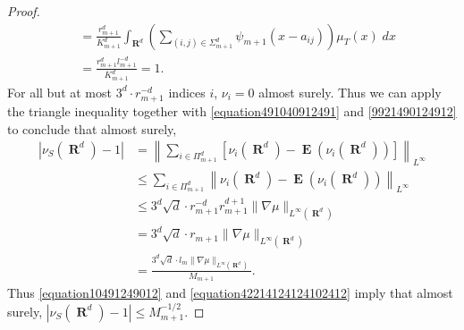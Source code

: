 \documentclass[12pt,reqno]{article}
\numberwithin{equation}{section}
\DeclareMathOperator{\RR}{\mathbf{R}}
\DeclareMathOperator{\EE}{\mathbf{E}}
\begin{document}
\begin{proof}
\begin{equation}
\begin{split}
        &= \frac{r_{m+1}^d}{K_{m+1}^d} \int_{\RR^d} \left( \sum\nolimits_{(i,j) \in \Sigma_{m+1}^d} \psi_{m+1}(x - a_{ij}) \right) \mu_T(x)\; dx\\
        &= \frac{r_{m+1}^d l_{m+1}^{-d}}{K_{m+1}^d} = 1.
    \end{split}
    \end{equation}
    For all but at most $3^d \cdot r_{m+1}^{-d}$ indices $i$, $\nu_i = 0$ almost surely. Thus we can apply the triangle inequality together with \eqref{equation491040912491} and \eqref{9921490124912} to conclude that almost surely,
    \begin{equation} \label{equation42214124124102412}
    \begin{split}
        |\nu_S(\RR^d) - 1| &= \left\| \sum\nolimits_{i \in \Pi_{m+1}^d} \left[ \nu_i(\RR^d) - \EE(\nu_i(\RR^d)) \right] \right\|_{L^\infty} \\
        &\leq \sum\nolimits_{i \in \Pi_{m+1}^d} \left\| \nu_i(\RR^d) - \EE(\nu_i(\RR^d)) \right\|_{L^\infty}\\
        &\leq 3^d \sqrt{d} \cdot r_{m+1}^{-d} r_{m+1}^{d+1} \| \nabla \mu \|_{L^\infty(\RR^d)}\\
        &= 3^d \sqrt{d} \cdot r_{m+1} \| \nabla \mu \|_{L^\infty(\RR^d)}\\
        &= \frac{3^d \sqrt{d} \cdot l_m \| \nabla \mu \|_{L^\infty(\RR^d)}}{M_{m+1}}.
    \end{split}
    \end{equation}  
    Thus \eqref{equation10491249012} and \eqref{equation42214124124102412} imply that almost surely, $|\nu_S(\RR^d) - 1| \leq M_{m+1}^{-1/2}$.
\end{proof}
\end{document}
